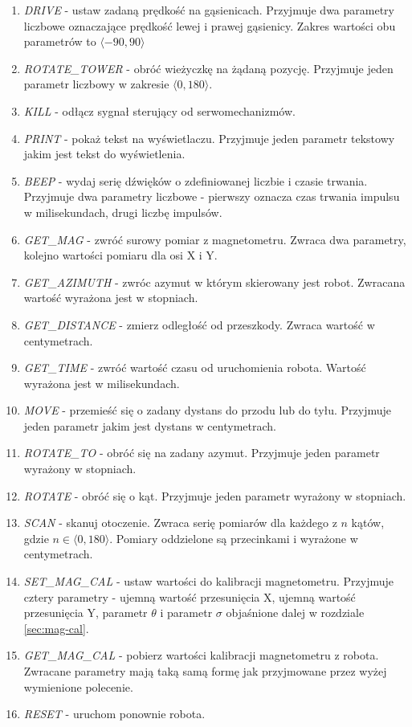 \begin{enumerate}
    \item \emph{DRIVE} - ustaw zadaną prędkość na gąsienicach. Przyjmuje dwa parametry liczbowe oznaczające prędkość lewej i prawej gąsienicy. Zakres wartości obu parametrów to $\langle-90,90\rangle$
    \item \emph{ROTATE\_TOWER} - obróć wieżyczkę na żądaną pozycję. Przyjmuje jeden parametr liczbowy w zakresie $\langle0,180\rangle$.
    \item \emph{KILL} - odłącz sygnał sterujący od serwomechanizmów.
    \item \emph{PRINT} - pokaż tekst na wyświetlaczu. Przyjmuje jeden parametr tekstowy jakim jest tekst do wyświetlenia.
    \item \emph{BEEP} - wydaj serię dźwięków o zdefiniowanej liczbie i czasie trwania. Przyjmuje dwa parametry liczbowe - pierwszy oznacza czas trwania impulsu w milisekundach, drugi liczbę impulsów.
    \item \emph{GET\_MAG} - zwróć surowy pomiar z magnetometru. Zwraca dwa parametry, kolejno wartości pomiaru dla osi X i Y.
    \item \emph{GET\_AZIMUTH} - zwróc azymut w którym skierowany jest robot. Zwracana wartość wyrażona jest w stopniach.
    \item \emph{GET\_DISTANCE} - zmierz odległość od przeszkody. Zwraca wartość w centymetrach.
    \item \emph{GET\_TIME} - zwróć wartość czasu od uruchomienia robota. Wartość wyrażona jest w milisekundach.
    \item \emph{MOVE} - przemieść się o zadany dystans do przodu lub do tyłu. Przyjmuje jeden parametr jakim jest dystans w centymetrach.
    \item \emph{ROTATE\_TO} - obróć się na zadany azymut. Przyjmuje jeden parametr wyrażony w stopniach.
    \item \emph{ROTATE} - obróć się o kąt. Przyjmuje jeden parametr wyrażony w stopniach.
    \item \emph{SCAN} - skanuj otoczenie. Zwraca serię pomiarów dla każdego z $n$ kątów, gdzie $n\in{\langle0,180\rangle}$. Pomiary oddzielone są przecinkami i wyrażone w centymetrach.
    \item \emph{SET\_MAG\_CAL} - ustaw wartości do kalibracji magnetometru. Przyjmuje cztery parametry - ujemną wartość przesunięcia X, ujemną wartość przesunięcia Y, parametr $\theta$ i parametr $\sigma$ objaśnione dalej w rozdziale \ref{sec:mag-cal}. 
    \item \emph{GET\_MAG\_CAL} - pobierz wartości kalibracji magnetometru z robota. Zwracane parametry mają taką samą formę jak przyjmowane przez wyżej wymienione polecenie.
    \item \emph{RESET} - uruchom ponownie robota.
\end{enumerate}



